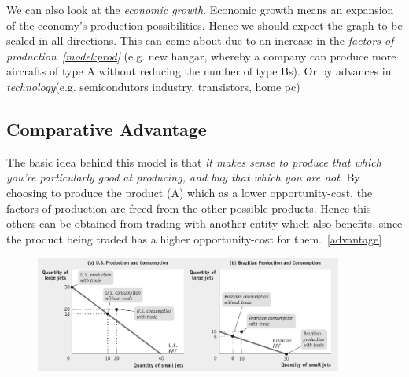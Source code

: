 \documentclass[english,course, draft]{Notes}
\newcommand{\ita}[1]{\textit{#1}}
\begin{document}
\par{We can also look at the \ita{economic growth}. Economic growth means an expansion of the economy's production possibilities. Hence we should expect the graph to be scaled in all directions. This can come about due to an increase in the \ita{factors of production~\ref{model:prod}} (e.g. new hangar, whereby a company can produce more aircrafts of type A without reducing the number of type Bs). Or by advances in \ita{technology}(e.g. semicondutors industry, transistors, home pc)}



\subsection{Comparative Advantage}

\par{The basic idea behind this model is that \ita{it makes sense to produce that which you're particularly good at producing, and buy that which you are not}. By choosing to produce the product (A) which as a lower opportunity-cost, the factors of production are freed from the other possible products. Hence this others can be obtained from trading with another entity which also benefits, since the product being traded has a higher opportunity-cost for them.~\ref{advantage}}


\begin{figure}[ht]
\centering
\includegraphics[width=0.9\textwidth]{jetsTrade.png}
\end{figure}


\end{document}
